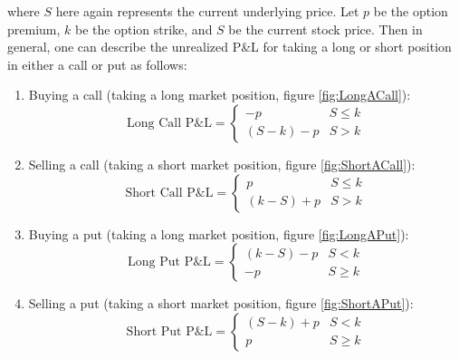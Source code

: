 \documentclass[12pt, a4paper, notitlepage]{article}
\numberwithin{equation}{subsection}
\numberwithin{figure}{subsection}
\numberwithin{table}{subsection}
\newcommand{\newpar}{\newline \newline}
\begin{document}
where $S$ here again represents the current underlying price.
\newpar
Let $p$ be the option premium, $k$ be the option strike, and $S$ be the current stock price.  Then in general, one can describe the unrealized P\&L for taking a long or short position in either a call or put as follows:
\begin{enumerate}
\item Buying a call (taking a long market position, figure \ref{fig:LongACall}):
      \begin{equation*}
          \text{Long Call P\&L} = 
          \begin{cases}
              -p 				& S \leq k \\
               (S - k) - p	& S > k
          \end{cases}
      \end{equation*}
\item Selling a call (taking a short market position, figure \ref{fig:ShortACall}):
      \begin{equation*}
        \text{Short Call P\&L} = 
        \begin{cases}
              p 				& S \leq k \\
              (k - S) + p  	& S > k
        \end{cases}
      \end{equation*}
\item Buying a put (taking a long market position, figure \ref{fig:LongAPut}):
      \begin{equation*}
        \text{Long Put P\&L} = 
        \begin{cases}
                (k - S) - p 	& S < k \\
                -p 			& S \geq k
        \end{cases}
      \end{equation*}
\item Selling a put (taking a short market position, figure \ref{fig:ShortAPut}):
      \begin{equation*}
      	\text{Short Put P\&L} = 
        \begin{cases}
                (S - k) + p 	& S < k \\
                p 				& S \geq k
        \end{cases}
      \end{equation*}
\end{enumerate}
\end{document}
